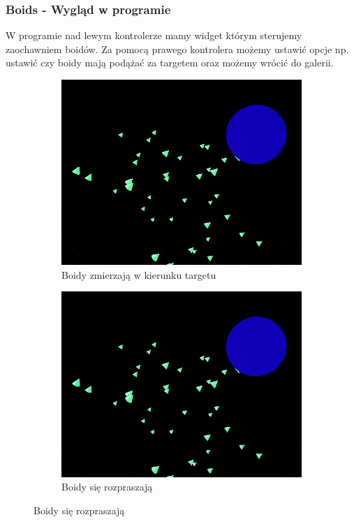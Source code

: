 \documentclass[a4paper,12pt,reqno]{article}
\begin{document}
\newpage
\subsubsection{Boids - Wygląd w programie}

W programie nad lewym kontrolerze mamy widget którym sterujemy zaochawniem boidów. Za pomocą prawego kontrolera możemy ustawić opcje np. ustawić czy boidy mają podążać za targetem oraz możemy wrócić do galerii.

\begin{figure}[H]%
	\centering
	\begin{subfigure}{.5\textwidth}
		\centering
		\includegraphics[width=0.8\linewidth]{graphics//boids/BoidsInUE.png}
		\caption{Boidy zmierzają w kierunku targetu }	
		\label{ref:subref_a}
	\end{subfigure}%
	\begin{subfigure}{.5\textwidth}
		\centering
		\includegraphics[width=0.8\linewidth]{graphics//boids/BoidsInUE.png}
		\caption{Boidy się rozpraszają}
		\label{ref:subref_b}
	\end{subfigure}%
\label{ref:ref}
\end{figure}
\end{document}
